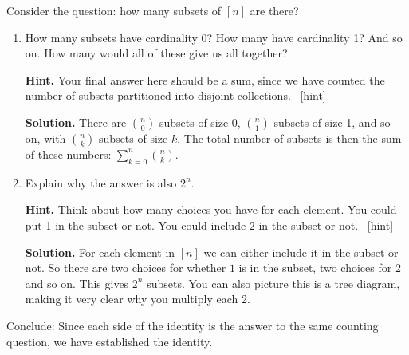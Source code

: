 \documentclass{book}
\begin{document}
\setcounter{project}{78}
\addtocounter{project}{-1}
\begin{activity}[]\label{activity-pascalrow-dc}
\hypertarget{p-616}{}%
Consider the question: how many subsets of \([n]\) are there?%
\begin{enumerate}[font=\bfseries,label=(\alph*),ref=\alph*]
\item\label{task-112} \hypertarget{p-617}{}%
How many subsets have cardinality 0?  How many have cardinality 1?  And so on.  How many would all of these give us all together?%
\par\smallskip%
\noindent\textbf{Hint.}\hypertarget{hint-34}{}\quad%
\hypertarget{p-618}{}%
Your final answer here should be a sum, since we have counted the number of subsets partitioned into disjoint collections.%
~\hfill{\tiny\hyperlink{a-78.a}{[hint]}\hypertarget{q-78.a}{}}\par\smallskip%
\noindent\textbf{Solution.}\hypertarget{solution-60}{}\quad%
\hypertarget{p-619}{}%
There are \(\binom{n}{0}\) subsets of size 0, \(\binom{n}{1}\) subsets of size 1, and so on, with \(\binom{n}{k}\) subsets of size \(k\).  The total number of subsets is then the sum of these numbers: \(\sum_{k=0}^n \binom{n}{k}\).%
\item\label{task-113} \hypertarget{p-620}{}%
Explain why the answer is also \(2^n\).%
\par\smallskip%
\noindent\textbf{Hint.}\hypertarget{hint-35}{}\quad%
\hypertarget{p-621}{}%
Think about how many choices you have for each element.  You could put 1 in the subset or not.  You could include \(2\) in the subset or not.%
~\hfill{\tiny\hyperlink{a-78.b}{[hint]}\hypertarget{q-78.b}{}}\par\smallskip%
\noindent\textbf{Solution.}\hypertarget{solution-61}{}\quad%
\hypertarget{p-622}{}%
For each element in \([n]\) we can either include it in the subset or not.  So there are two choices for whether \(1\) is in the subset, two choices for \(2\) and so on.  This gives \(2^n\) subsets.  You can also picture this is a tree diagram, making it very clear why you multiply each 2.%
\end{enumerate}
\bigbreak
\hypertarget{p-623}{}%
Conclude: Since each side of the identity is the answer to the same counting question, we have established the identity.%
\end{activity}
\end{document}

